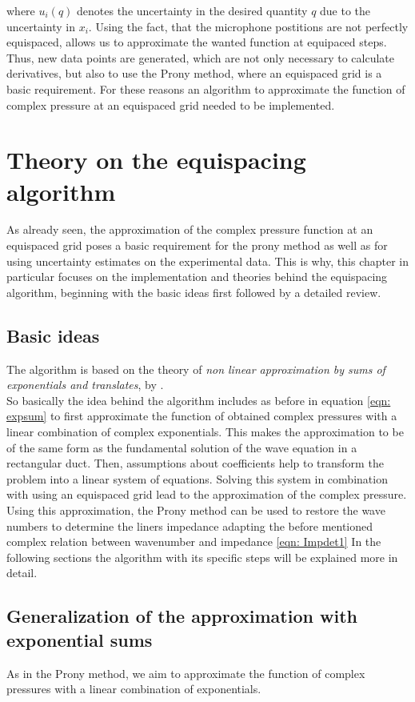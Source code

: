 \documentclass[11pt]{report} %
\begin{document}
where $u_{i}(q)$ denotes the uncertainty in the desired quantity $q$ due to the uncertainty in $x_{i}$.
Using the fact, that the microphone postitions are not perfectly equispaced, allows us to approximate the wanted function at equipaced steps.
Thus, new data points are generated, which are not only necessary to calculate derivatives, but also to use the Prony method, where an equispaced grid is a basic requirement.
For these reasons an algorithm to approximate the function of complex pressure at an equispaced grid needed to be implemented. 
  
\chapter{Theory on the equispacing algorithm} 
As already seen, the approximation of the complex pressure function at an equispaced grid poses a basic requirement for the prony method as well as for using uncertainty estimates on the experimental data.
This is why, this chapter in particular focuses on the implementation and theories behind the equispacing algorithm, beginning with the basic ideas first followed by a detailed review. 

\section{Basic ideas}
The algorithm is based on the theory of \textit{non linear approximation by sums of exponentials and translates}, by \cite{Peter2011}.\\
So basically the idea behind the algorithm includes as before in equation \eqref{eqn: expsum} to first approximate the function of obtained complex pressures with a linear combination of complex exponentials.
This makes the approximation to be of the same form as the fundamental solution of the wave equation in a rectangular duct.
Then, assumptions about coefficients help to transform the problem into a linear system of equations. Solving this system in combination with using an equispaced grid lead to the approximation of the complex pressure. 
Using this approximation, the Prony method can be used to restore the wave numbers to determine the liners impedance adapting the before mentioned complex relation between wavenumber and impedance \ref{eqn: Impdet1} 
In the following sections the algorithm with its specific steps will be explained more in detail. 

\section{Generalization of the approximation with exponential sums}
As in the Prony method, we aim to approximate the function of complex pressures with a linear combination of exponentials.
\end{document}
